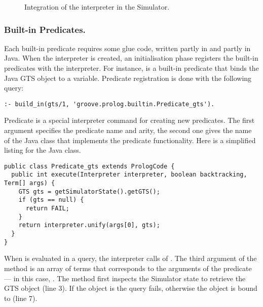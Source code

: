 \begin{figure}[t]
\centering
{}
\caption{Integration of the \Prolog interpreter in the \GROOVE Simulator.}
\end{figure}
%

\vspace{-9pt}
\subsubsection{Built-in Predicates.} Each built-in \GROOVE predicate requires
some glue code, written partly in \Prolog and partly in Java. When the \Prolog
interpreter is created, an initialisation phase registers the built-in
predicates with the interpreter. For instance,  is a built-in
predicate that binds the Java GTS object to a \Prolog variable. Predicate
registration is done with the following query:
%
\begin{lstlisting}[style=prolog]
:- build_in(gts/1, 'groove.prolog.builtin.Predicate_gts').
\end{lstlisting}
%
Predicate  is a special interpreter command for creating new
predicates. The first argument specifies the predicate name and arity, the
second one gives the name of the Java class that implements the predicate
functionality.  Here is a simplified listing for the Java
 class.
%
\begin{lstlisting}[style=java]
public class Predicate_gts extends PrologCode {
  public int execute(Interpreter interpreter, boolean backtracking, Term[] args) {
    GTS gts = getSimulatorState().getGTS();
    if (gts == null) {
      return FAIL;
    }
    return interpreter.unify(args[0], gts);
  }
}
\end{lstlisting}
%
When  is evaluated in a query, the interpreter calls
 of . The third argument of the method is
an array of \Prolog terms that corresponds to the arguments of the predicate
--- in this case, . The method first inspects the Simulator state to
retrieve the GTS object (line 3). If the object is  the query
fails, otherwise the object is bound to  (line 7).


\vspace{-9pt}
